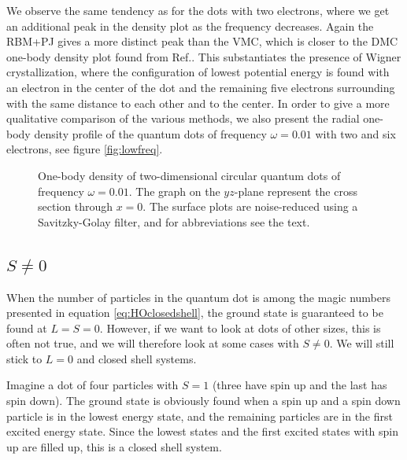 We observe the same tendency as for the dots with two electrons, where we get an additional peak in the density plot as the frequency decreases. Again the RBM+PJ gives a more distinct peak than the VMC, which is closer to the DMC one-body density plot found from Ref.\cite{hogberget_quantum_2013}. This substantiates the presence of Wigner crystallization, where the configuration of lowest potential energy is found with an electron in the center of the dot and the remaining five electrons surrounding with the same distance to each other and to the center. In order to give a more qualitative comparison of the various methods, we also present the radial one-body density profile of the quantum dots of frequency $\omega=0.01$ with two and six electrons, see figure \eqref{fig:lowfreq}. 

\begin{figure}[H]
	\centering
	\captionsetup[subfigure]{labelformat=empty}
	
	\caption{One-body density of two-dimensional circular quantum dots of frequency $\omega=0.01$. The graph on the $yz$-plane represent the cross section through $x=0$. The surface plots are noise-reduced using a Savitzky-Golay filter, and for abbreviations see the text.}
	\label{fig:lowfreq}
\end{figure}

\iffalse
\subsection{$S\neq0$}
When the number of particles in the quantum dot is among the magic numbers presented in equation \eqref{eq:HOclosedshell}, the ground state is guaranteed to be found at $L=S=0$. However, if we want to look at dots of other sizes, this is often not true, and we will therefore look at some cases with $S\neq 0$. We will still stick to $L=0$ and closed shell systems.

Imagine a dot of four particles with $S=1$ (three have spin up and the last has spin down). The ground state is obviously found when a spin up and a spin down particle is in the lowest energy state, and the remaining particles are in the first excited energy state. Since the lowest states and the first excited states with spin up are filled up, this is a closed shell system.

